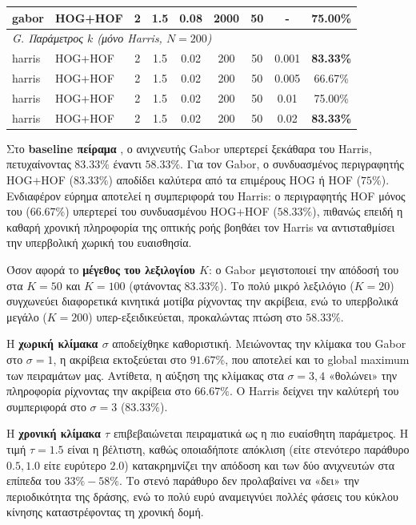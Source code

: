 \documentclass[12pt, a4paper]{article}
\begin{document}
\begin{longtable}{llccccccc}
gabor        & HOG+HOF & 2 & 1.5 & 0.08  & 2000 & 50 & - & 75.00\% \\
\midrule
\multicolumn{9}{l}{\textit{G. Παράμετρος $k$ (μόνο Harris, $N{=}200$)}} \\
harris       & HOG+HOF & 2 & 1.5 & 0.02  & 200 & 50 & 0.001 & \textbf{83.33\%} \\
harris       & HOG+HOF & 2 & 1.5 & 0.02  & 200 & 50 & 0.005 & 66.67\% \\
harris       & HOG+HOF & 2 & 1.5 & 0.02  & 200 & 50 & 0.01  & 75.00\% \\
harris       & HOG+HOF & 2 & 1.5 & 0.02  & 200 & 50 & 0.02  & \textbf{83.33\%} \\
\end{longtable}
\normalsize

Στο \textbf{baseline πείραμα} , ο ανιχνευτής Gabor υπερτερεί ξεκάθαρα του Harris, πετυχαίνοντας $83.33\%$ έναντι $58.33\%$. Για τον Gabor, ο συνδυασμένος περιγραφητής HOG+HOF ($83.33\%$) αποδίδει καλύτερα από τα επιμέρους HOG ή HOF ($75\%$). Ενδιαφέρον εύρημα αποτελεί η συμπεριφορά του Harris: ο περιγραφητής HOF μόνος του ($66.67\%$) υπερτερεί του συνδυασμένου HOG+HOF ($58.33\%$), πιθανώς επειδή η καθαρή χρονική πληροφορία της οπτικής ροής βοηθάει τον Harris να αντισταθμίσει την υπερβολική χωρική του ευαισθησία.

Όσον αφορά το \textbf{μέγεθος του λεξιλογίου $K$}: ο Gabor μεγιστοποιεί την απόδοσή του στα $K{=}50$ και $K{=}100$ (φτάνοντας $83.33\%$). Το πολύ μικρό λεξιλόγιο ($K{=}20$) συγχωνεύει διαφορετικά κινητικά μοτίβα ρίχνοντας την ακρίβεια, ενώ το υπερβολικά μεγάλο ($K{=}200$) υπερ-εξειδικεύεται, προκαλώντας πτώση στο $58.33\%$.

Η \textbf{χωρική κλίμακα $\sigma$} αποδείχθηκε καθοριστική. Μειώνοντας την κλίμακα του Gabor στο $\sigma{=}1$, η ακρίβεια εκτοξεύεται στο \textbf{$91.67\%$}, που αποτελεί και το global maximum των πειραμάτων μας. Αντίθετα, η αύξηση της κλίμακας στα $\sigma{=}3, 4$ «θολώνει» την πληροφορία ρίχνοντας την ακρίβεια στο $66.67\%$. Ο Harris δείχνει την καλύτερή του συμπεριφορά στο $\sigma{=}3$ ($83.33\%$).

Η \textbf{χρονική κλίμακα $\tau$} επιβεβαιώνεται πειραματικά ως η πιο ευαίσθητη παράμετρος. Η τιμή $\tau{=}1.5$ είναι η βέλτιστη, καθώς οποιαδήποτε απόκλιση (είτε στενότερο παράθυρο $0.5, 1.0$ είτε ευρύτερο $2.0$) κατακρημνίζει την απόδοση και των δύο ανιχνευτών στα επίπεδα του $33\%-58\%$. Το στενό παράθυρο δεν προλαβαίνει να «δει» την περιοδικότητα της δράσης, ενώ το πολύ ευρύ αναμειγνύει πολλές φάσεις του κύκλου κίνησης καταστρέφοντας τη χρονική δομή.
\end{document}
